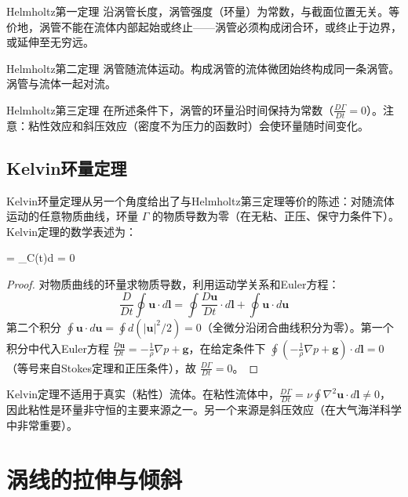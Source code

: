 \begin{myTheorem}{Helmholtz第一定理}
沿涡管长度，涡管强度（环量）为常数，与截面位置无关。等价地，涡管不能在流体内部起始或终止——涡管必须构成闭合环，或终止于边界，或延伸至无穷远。
\end{myTheorem}

\begin{myTheorem}{Helmholtz第二定理}
涡管随流体运动。构成涡管的流体微团始终构成同一条涡管。涡管与流体一起对流。
\end{myTheorem}

\begin{myTheorem}{Helmholtz第三定理}
在所述条件下，涡管的环量沿时间保持为常数（$\frac{D\Gamma}{Dt}=0$）。注意：粘性效应和斜压效应（密度不为压力的函数时）会使环量随时间变化。
\end{myTheorem}

\subsection{Kelvin环量定理}

Kelvin环量定理从另一个角度给出了与Helmholtz第三定理等价的陈述：对随流体运动的任意物质曲线，环量 $\Gamma$ 的物质导数为零（在无粘、正压、保守力条件下）。Kelvin定理的数学表述为：

\begin{myformula}
     = \oint_{C(t)}\cdot d = 0
\end{myformula}

\begin{proof}
对物质曲线的环量求物质导数，利用运动学关系和Euler方程：
\[
\frac{D}{Dt}\oint\mathbf{u}\cdot d\mathbf{l} = \oint\frac{D\mathbf{u}}{Dt}\cdot d\mathbf{l} + \oint\mathbf{u}\cdot d\mathbf{u}
\]
第二个积分 $\oint\mathbf{u}\cdot d\mathbf{u} = \oint d(|\mathbf{u}|^{2}/2) = 0$（全微分沿闭合曲线积分为零）。第一个积分中代入Euler方程 $\frac{D\mathbf{u}}{Dt} = -\frac{1}{\rho}\nabla p + \mathbf{g}$，在给定条件下 $\oint(-\frac{1}{\rho}\nabla p + \mathbf{g})\cdot d\mathbf{l} = 0$（等号来自Stokes定理和正压条件），故 $\frac{D\Gamma}{Dt}=0$。
\end{proof}

\begin{remark}
Kelvin定理不适用于真实（粘性）流体。在粘性流体中，$\frac{D\Gamma}{Dt} = \nu\oint\nabla^{2}\mathbf{u}\cdot d\mathbf{l} \neq 0$，因此粘性是环量非守恒的主要来源之一。另一个来源是斜压效应（在大气海洋科学中非常重要）。
\end{remark}

\section{涡线的拉伸与倾斜}

